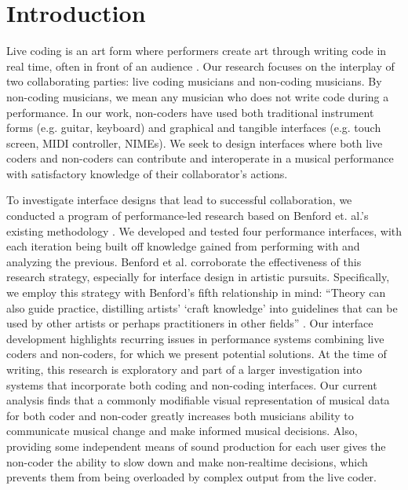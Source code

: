 \documentclass{nime-alternate}
\begin{document}

\printccsdesc

\section{Introduction}
Live coding is an art form where performers create art through writing code in real time, often in front of an audience \cite{collins_live_2003}. Our research focuses on the interplay of two collaborating parties: live coding musicians and non-coding musicians. By non-coding musicians, we mean any musician who does not write code during a performance. In our work, non-coders have used both traditional instrument forms (e.g. guitar, keyboard) and graphical and tangible interfaces (e.g. touch screen, MIDI controller, NIMEs). We seek to design interfaces where both live coders and non-coders can contribute and interoperate in a musical performance with satisfactory knowledge of their collaborator's actions. 

To investigate interface designs that lead to successful collaboration, we conducted a program of performance-led research based on Benford et. al.'s existing methodology \cite{benford_performance-led_2013}. We developed and tested four performance interfaces, with each iteration being built off knowledge gained from performing with and analyzing the previous. Benford et al. \cite{benford_performance-led_2013} corroborate the effectiveness of this research strategy, especially for interface design in artistic pursuits. Specifically, we employ this strategy with Benford's fifth relationship in mind: ``Theory can also guide practice, distilling artists' `craft knowledge' into guidelines that can be used by other artists or perhaps practitioners in other fields'' \cite{benford_performance-led_2013}. Our interface development highlights recurring issues in performance systems combining live coders and non-coders, for which we present potential solutions. At the time of writing, this research is exploratory and part of a larger investigation into systems that incorporate both coding and non-coding interfaces. Our current analysis finds that a commonly modifiable visual representation of musical data for both coder and non-coder greatly increases both musicians ability to communicate musical change and make informed musical decisions. Also, providing some independent means of sound production for each user gives the non-coder the ability to slow down and make non-realtime decisions, which prevents them from being overloaded by complex output from the live coder.
\end{document}
